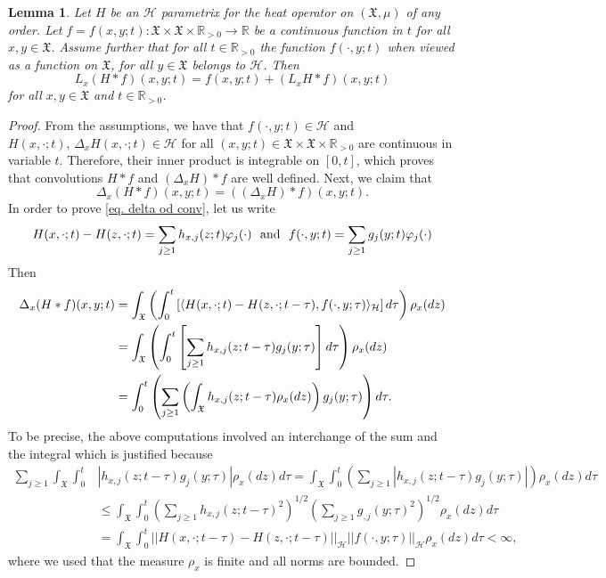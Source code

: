 \documentclass[10pt,a4paper]{amsart}
\newtheorem{lemma}{Lemma}
\newcommand{\X}{\mathfrak{X}}
\begin{document}
\begin{lemma}
\label{lem: L of convolHilb S}
Let $H$ be an $\mathcal{H}$ parametrix for the heat operator on $(\X,\mu)$ of any order.
Let $f=f(x,y;t):\X\times \X\times\mathbb{R}_{> 0}\to\mathbb{R}$
be a continuous function in $t$ for all $x,y\in \X$. Assume further that for all $t\in \mathbb{R}_{>0}$ the function
$f(\cdot,y;t)$ when viewed as a function on $\X$, for all $y\in\X$ belongs to $\mathcal{H}$.  Then
$$
L_{x}( H\ast f)(x,y;t)=f(x,y;t)+(L_{x}H \ast f)(x,y;t)
$$
for all $x,y\in \X$ and $t\in\mathbb{R}_{>0}$.
\end{lemma}

\begin{proof} From the assumptions, we have that $f(\cdot, y;t)\in \mathcal{H}$ and $H(x,\cdot;t), \, \Delta_{x}H(x,\cdot;t)\in \mathcal{H}$
for all $(x,y;t) \in \X\times \X \times \mathbb{R}_{>0}$ are continuous in variable $t$.  Therefore,
their inner product is integrable on $[0,t]$, which proves that convolutions $H\ast f$ and $(\Delta_{x}H)\ast f$ are well defined.
Next, we claim that
\begin{equation}\label{eq. delta od conv}
  \Delta_{x}(H\ast f)(x,y;t) =  \left( (\Delta_{x}H)\ast f\right)(x,y;t).
\end{equation}
In order to prove \eqref{eq. delta od conv}, let us write
$$
H(x,\cdot;t)- H(z,\cdot;t)=\sum_{j\geq 1}h_{x,j}(z;t)\varphi_j(\cdot)
\,\,\,\,
\text{\rm and}
\,\,\,\,
f(\cdot,y;t)=  \sum_{j\geq 1}g_j(y;t)\varphi_j(\cdot)
$$
Then
\begin{align} \notag
 \Delta_{x}(H\ast f)(x,y;t) &= \int_\X\left(\int_0^t \left[ \langle H(x,\cdot;t)- H(z,\cdot;t-\tau),  f(\cdot,y;\tau) \rangle_{\mathcal{H}} \right] d\tau\right)\rho_x(dz)\\ \notag
 &=\int_\X\left(\int_0^t \left[ \sum_{j\geq 1} h_{x,j}(z;t-\tau)g_j(y;\tau) \right] d\tau\right)\rho_x(dz)\\ &= \int_0^t \left( \sum_{j\geq 1} \left(\int_\X  h_{x,j}(z;t-\tau) \rho_x(dz)\right) g_j(y;\tau)  \right)d\tau\label{eq. interchange od deltax}.
\end{align}
To be precise, the above computations involved an
interchange of the sum and the integral which is justified because
\begin{align*}
\sum_{j\geq 1} \int_\X \int_0^t &| h_{x,j}(z;t-\tau)g_j(y;\tau)  | \rho_x(dz) d\tau = \int_\X \int_0^t \left(\sum_{j\geq 1}| h_{x,j}(z;t-\tau)g_j(y;\tau)  |\right)  \rho_x(dz) d\tau\\ &\leq \int_\X \int_0^t \left(\sum_{j\geq 1} h_{x,j}(z;t-\tau)^2 \right)^{1/2} \left(\sum_{j\geq 1} g_{,j}(y;\tau)^2 \right)^{1/2 }\rho_x(dz) d\tau \\&=\int_\X \int_0^t ||H(x,\cdot;t-\tau)- H(z,\cdot;t-\tau) ||_\mathcal{H} ||f(\cdot,y;\tau) ||_\mathcal{H}\rho_x(dz) d\tau <\infty,
\end{align*}
where we used that the measure $\rho_x$ is finite and all norms are bounded.


\end{proof}
\end{document}
